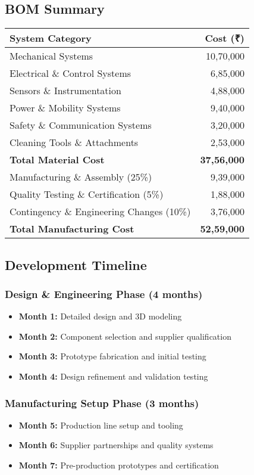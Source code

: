 \documentclass[11pt,a4paper]{article}
\begin{document}
\subsection{BOM Summary}
\begin{center}
\begin{tabular}{lr}
\toprule
\textbf{System Category} & \textbf{Cost (₹)} \\
\midrule
Mechanical Systems & 10,70,000 \\
Electrical \& Control Systems & 6,85,000 \\
Sensors \& Instrumentation & 4,88,000 \\
Power \& Mobility Systems & 9,40,000 \\
Safety \& Communication Systems & 3,20,000 \\
Cleaning Tools \& Attachments & 2,53,000 \\
\midrule
\textbf{Total Material Cost} & \textbf{37,56,000} \\
Manufacturing \& Assembly (25\%) & 9,39,000 \\
Quality Testing \& Certification (5\%) & 1,88,000 \\
Contingency \& Engineering Changes (10\%) & 3,76,000 \\
\midrule
\textbf{Total Manufacturing Cost} & \textbf{52,59,000} \\
\bottomrule
\end{tabular}
\end{center}

\subsection{Development Timeline}

\subsubsection{Design \& Engineering Phase (4 months)}
\begin{itemize}[leftmargin=2em]
    \item \textbf{Month 1:} Detailed design and 3D modeling
    \item \textbf{Month 2:} Component selection and supplier qualification
    \item \textbf{Month 3:} Prototype fabrication and initial testing
    \item \textbf{Month 4:} Design refinement and validation testing
\end{itemize}

\subsubsection{Manufacturing Setup Phase (3 months)}
\begin{itemize}[leftmargin=2em]
    \item \textbf{Month 5:} Production line setup and tooling
    \item \textbf{Month 6:} Supplier partnerships and quality systems
    \item \textbf{Month 7:} Pre-production prototypes and certification
\end{itemize}
\end{document}
